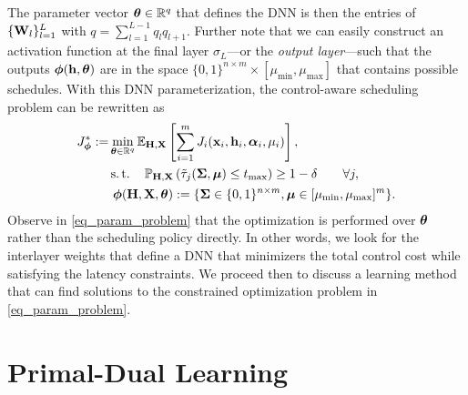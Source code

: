 \documentclass[conference,10pt]{IEEEtran}
\def\E{\mathbb{E}}
\begin{document}
The parameter vector $\boldsymbol{\theta} \in {\mathbb R}^q$ that defines the DNN is then the entries of $\{ {\mathbf W}_l \}_{l=1}^L$ with $q = \sum_{l=1}^{L-1} q_l q_{l+1} $. Further note that we can easily construct an activation function at the final layer $\mathbb{\sigma}_L$---or the \emph{output layer}---such that the outputs $\boldsymbol{\phi}({\mathbf h},\boldsymbol{\theta})$ are in the space $\{0,1\}^{n \times m} \times [\mu_{\min},\mu_{\max}]$ that contains possible schedules. With this DNN parameterization, the control-aware scheduling problem can be rewritten as
%
\begin{alignat}{2} \label{eq_param_problem}
   J_{\bbphi}^* := &  \min_{\bbtheta \in \reals^q}  \E_{\bbH,\bbX} \left[ \sum_{i=1}^m J_i(\bbx_i,\bbh_i, \bbalpha_i, \mu_i) \right],             \\
        &  \st           \quad           \mathbb{P}_{\bbH,\bbX} \left( \tilde{\tau}_j(\bbSigma, \bbmu) \leq t_{\max} \right)   \geq 1-  \delta \qquad \forall j,   \nonumber \\
        &     \                       \bbphi(\bbH,\bbX,\bbtheta) := \{ \bbSigma \in  \{0,1\}^{n \times m}, \bbmu \in [\mu_{\min},\mu_{\max}]^m \}.   \nonumber%
\end{alignat}
% 
Observe in \eqref{eq_param_problem} that the optimization is performed over $\boldsymbol{\theta}$ rather than the scheduling policy directly. In other words, we look for the interlayer weights that define a DNN that minimizers the total control cost while satisfying the latency constraints. We proceed then to discuss a learning method that can find solutions to the constrained optimization problem in \eqref{eq_param_problem}.


\section{Primal-Dual Learning}\label{sec_primal_dual}







\end{document}
